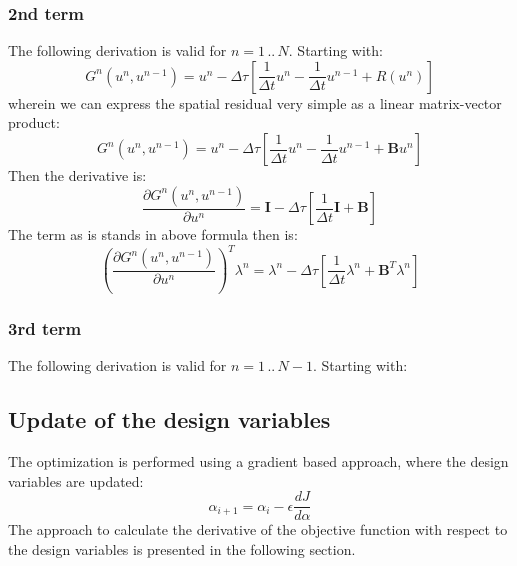 \documentclass[10pt]{article}
\begin{document}
\subsubsection*{2nd term}
The following derivation is valid for $n = 1\,..\,N$. Starting with:
\begin{equation}
G^n\left( u^n,u^{n-1} \right) = u^n - \Delta\tau\left[ \frac{1}{\Delta t} u^{n} - \frac{1}{\Delta t} u^{n-1} + R \left( u^n \right) \right]
\end{equation}
wherein we can express the spatial residual very simple as a linear matrix-vector product:
\begin{equation}
G^n\left( u^n,u^{n-1} \right) = u^n - \Delta\tau\left[ \frac{1}{\Delta t} u^{n} - \frac{1}{\Delta t} u^{n-1} + \mathbf{B}u^n  \right]
\end{equation}
Then the derivative is:
\begin{equation}
\frac{\partial G^n\left( u^n,u^{n-1} \right)}{\partial u^n} = \mathbf{I} - \Delta\tau\left[ \frac{1}{\Delta t} \mathbf{I} + \mathbf{B} \right]
\end{equation}
The term as is stands in above formula then is:
\begin{equation}
\left( \frac{\partial G^n\left( u^n,u^{n-1} \right)}{\partial u^n} \right)^T \lambda^n = \lambda^n - \Delta\tau\left[ \frac{1}{\Delta t} \lambda^n + \mathbf{B}^T \lambda^n \right]
\end{equation}
\subsubsection*{3rd term}
The following derivation is valid for $n = 1\,..\,N-1$. Starting with:
\subsection{Update of the design variables}
The optimization is performed using a gradient based approach, where the design variables are updated:
\begin{equation}
\alpha_{i+1} = \alpha_i - \epsilon \frac{d J}{d \alpha}
\end{equation}
The approach to calculate the derivative of the objective function with respect to the design variables is presented in the following section.
\end{document}
